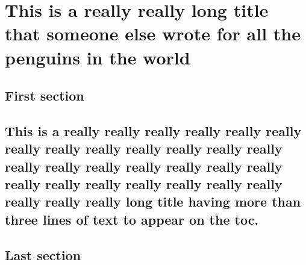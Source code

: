 \chapter{This is a really really long title that someone else wrote for all the penguins in the world}
\lipsum[2]

\section{First section}
\lipsum[3]

\section{This is a really really really really really really really really really really really really really really really really really really really really really really really really really really really really really really long title having more than three lines of text to appear on the toc.}
\lipsum[3-4]

\section{Last section} 
\lipsum[4]
